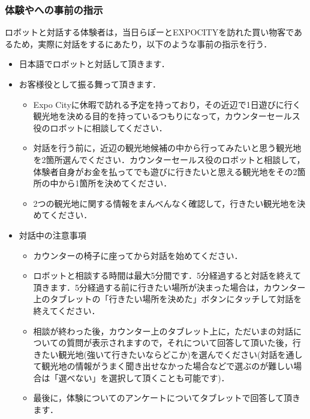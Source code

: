 \subsubsection{体験やへの事前の指示}
ロボットと対話する体験者は，当日らぽーとEXPOCITYを訪れた買い物客であるため，実際に対話をするにあたり，以下のような事前の指示を行う．

\begin{itemize}
    \item 日本語でロボットと対話して頂きます．
    \item お客様役として振る舞って頂きます．
    \begin{itemize}
        \item Expo Cityに休暇で訪れる予定を持っており，その近辺で1日遊びに行く観光地を決める目的を持っているつもりになって，カウンターセールス役のロボットに相談してください．
        \item 対話を行う前に，近辺の観光地候補の中から行ってみたいと思う観光地を2箇所選んでください．カウンターセールス役のロボットと相談して，体験者自身がお金を払ってでも遊びに行きたいと思える観光地をその2箇所の中から1箇所を決めてください．
        \item 2つの観光地に関する情報をまんべんなく確認して，行きたい観光地を決めてください．
    \end{itemize}
    \item 対話中の注意事項
    \begin{itemize}
    \item カウンターの椅子に座ってから対話を始めてください．
    \item ロボットと相談する時間は最大5分間です．5分経過すると対話を終えて頂きます．5分経過する前に行きたい場所が決まった場合は，カウンター上のタブレットの「行きたい場所を決めた」ボタンにタッチして対話を終えてください．
    \item 相談が終わった後，カウンター上のタブレット上に，ただいまの対話についての質問が表示されますので，それについて回答して頂いた後，行きたい観光地(強いて行きたいならどこか)を選んでください(対話を通して観光地の情報がうまく聞き出せなかった場合などで選ぶのが難しい場合は「選べない」を選択して頂くことも可能です)．
    \item 最後に，体験についてのアンケートについてタブレットで回答して頂きます．
    \end{itemize}
\end{itemize}

